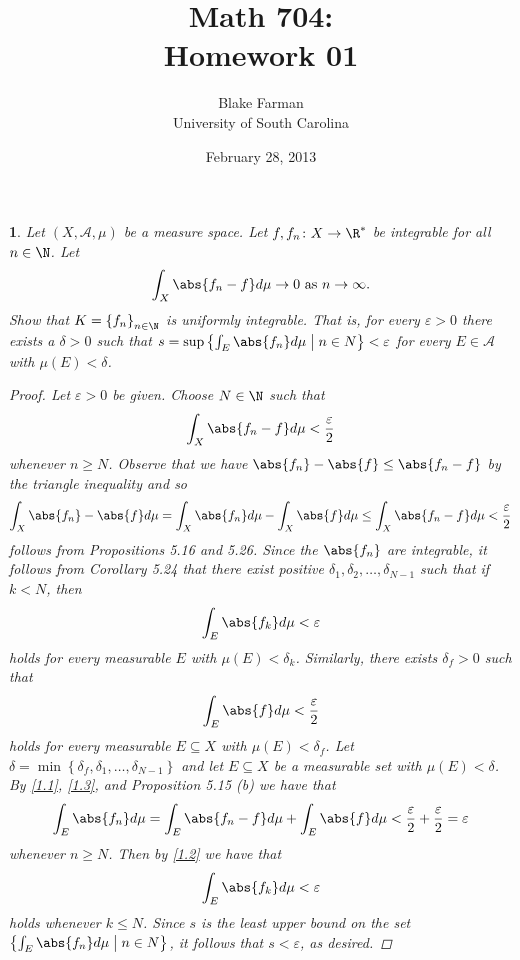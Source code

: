 \documentclass[10pt]{amsart}
\author{Blake Farman\\University of South Carolina}
\title{Math 704:\\Homework 01}
\date{February 28, 2013}
\begin{document}
\maketitle

\providecommand{\p}{\mathfrak{p}}
\providecommand{\m}{\mathfrak{m}}

\newtheorem{thm}{}
\newtheorem{lem}{Lemma}

\setcounter{thm}{1}

\begin{thm}\label{ex1}
  Let $(X, \mathcal{A}, \mu)$ be a measure space.
  Let $f, f_n \colon X \rightarrow \R^*$ be integrable for all $n \in \N$.
  Let 
  $$\int_{X} \abs{f_n - f} d\mu \rightarrow 0\ \text{as}\ n \rightarrow \infty.$$
  Show that $K = \left\{f_n\right\}_{n \in \N}$ is uniformly integrable.
  That is, for every $\varepsilon > 0$ there exists a $\delta > 0$ such that $s = \sup \left\{ \int_E \abs{f_n} d\mu \;\middle\vert\; n \in N\right\} < \varepsilon$ for every $E \in \mathcal{A}$ with $\mu(E) < \delta$.
  \begin{proof}
    Let $\varepsilon > 0$ be given.
    Choose $N \in \N$ such that 
    $$\int_X \abs{f_n - f} d\mu < \frac{\varepsilon}{2}$$
    whenever $n \geq N$.
    Observe that we have $\abs{f_n} - \abs{f} \leq \abs{f_n  - f}$ by the triangle inequality and so 
    \begin{equation}\label{1.1}
      \int_X \abs{f_n} - \abs{f} d\mu = \int_X \abs{f_n} d\mu - \int_X \abs{f} d\mu \leq \int_X \abs{f_n - f} d\mu < \frac{\varepsilon}{2}
    \end{equation}
    follows from Propositions 5.16 and 5.26.
    Since the $\abs{f_n}$ are integrable, it follows from Corollary 5.24 that there exist positive $\delta_1, \delta_2, \ldots, \delta_{N-1}$ such that if $k < N$, then
    \begin{equation}\label{1.2}
      \int_E \abs{f_k} d\mu < \varepsilon
    \end{equation}
    holds for every measurable $E$ with $\mu(E) < \delta_k$.
    Similarly, there exists $\delta_f > 0$ such that 
    \begin{equation}\label{1.3}
      \int_E \abs{f} d\mu < \frac{\varepsilon}{2}
    \end{equation}
    holds for every measurable $E \subseteq X$ with $\mu(E) < \delta_f$.
    Let $\delta = \min\left\{\delta_f, \delta_1, \ldots, \delta_{N-1}\right\}$ and let $E \subseteq X$ be a measurable set with $\mu(E) < \delta$.
    By \eqref{1.1}, \eqref{1.3}, and Proposition 5.15 (b) we have that 
    $$\int_E \abs{f_n} d\mu = \int_E \abs{f_n - f} d\mu + \int_E \abs{f} d\mu < \frac{\varepsilon}{2} + \frac{\varepsilon}{2} = \varepsilon$$
    whenever $n \geq N$.
    Then by \eqref{1.2} we have that
    $$\int_E \abs{f_k} d\mu < \varepsilon$$
    holds whenever $k \leq N$.
    Since $s$ is the least upper bound on the set $\left\{\int_E \abs{f_n} d\mu \;\middle\vert\; n \in N\right\}$, it follows that $s < \varepsilon$, as desired.
  \end{proof}
\end{thm}
  
\end{document}
